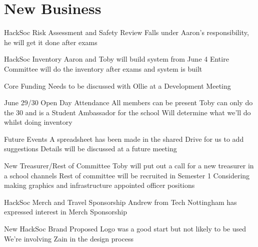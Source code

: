 \documentclass[11pt,hacksoc]{meetingmins}
\begin{document}
\section{New Business}
\begin{items}
\item
HackSoc Risk Assessment and Safety Review
\subitem
Falls under Aaron's responsibility, he will get it done after exams

\item
HackSoc Inventory
\subitem
Aaron and Toby will build system from June 4
\subitem
Entire Committee will do the inventory after exams and system is built

\item
Core Funding
\subitem
Needs to be discussed with Ollie at a Development Meeting

\item
June 29/30 Open Day Attendance
\subitem
All members can be present
\subsubitem
Toby can only do the 30 and is a Student Ambassador for the school
\subitem
Will determine what we'll do whilst doing inventory
\item
Future Events
\subitem
A spreadsheet has been made in the shared Drive for us to add suggestions
\subitem
Details will be discussed at a future meeting

\item
New Treasurer/Rest of Committee
\subitem
Toby will put out a call for a new treasurer in a school channels
\subitem
Rest of committee will be recruited in Semester 1
\subitem
Considering making graphics and infrastructure appointed officer positions

\item
HackSoc Merch and Travel Sponsorship
\subitem
Andrew from Tech Nottingham has expressed interest in Merch Sponsorship

\item
New HackSoc Brand
\subitem
Proposed Logo was a good start but not likely to be used
\subitem
We're involving Zain in the design process

\end{items}

\vspace{1em}
\end{document}
